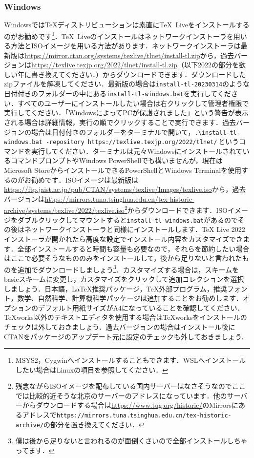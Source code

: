\subsubsection*{Windows}
Windowsでは\TeX ディストリビューションは素直に\TeX\ Liveをインストールするのがお勧めです\footnote{MSYS2，Cygwinへインストールすることもできます．WSLへインストールしたい場合はLinuxの項目を参照してください．}．\TeX\ Liveのインストールはネットワークインストーラを用いる方法とISOイメージを用いる方法があります．ネットワークインストーラは最新版は\url{https://mirror.ctan.org/systems/texlive/tlnet/install-tl.zip}から，過去バージョンは\url{https://texlive.texjp.org/2022/tlnet/install-tl.zip}（以下2022の部分を欲しい年に書き換えてください．）からダウンロードできます．ダウンロードしたzipファイルを解凍してください．最新版の場合は\texttt{install-tl-20230314}のような日付付きのフォルダーの中にある\texttt{install-tl-windows.bat}を実行してください．すべてのユーザーにインストールしたい場合は右クリックして管理者権限で実行してください．「WindowsによってPCが保護されました」という警告が表示される場合は詳細情報，実行の順でクリックすることで実行できます．過去バージョンの場合は日付付きのフォルダーをターミナルで開いて，\texttt{.\textbackslash install-tl-windows.bat -repository https://texlive.texjp.org/2022/tlnet/}\,というコマンドを実行してください．ターミナルは元々WindowsにインストールされているコマンドプロンプトやWindows PowerShellでも構いませんが，現在はMicrosoft StoreからインストールできるPowerShellとWindows Terminalを使用するのがお勧めです．ISOイメージは最新版は\url{https://ftp.jaist.ac.jp/pub/CTAN/systems/texlive/Images/texlive.iso}から，過去バージョンは\url{https://mirrors.tuna.tsinghua.edu.cn/tex-historic-archive/systems/texlive/2022/texlive.iso}\footnote{残念ながらISOイメージを配布している国内サーバーはなさそうなのでここでは比較的近そうな北京のサーバーのアドレスになっています．他のサーバーからダウンロードする場合は\url{https://www.tug.org/historic/}のMirrorsにあるアドレスで\texttt{https://mirrors.tuna.tsinghua.edu.cn/tex-historic-archive/}の部分を置き換えてください．}からダウンロードできます．ISOイメージをダブルクリックしてマウントすると\texttt{install-tl-windows.bat}があるのでその後はネットワークインストーラと同様にインストールします．TeX Live 2022インストーラが開かれたら高度な設定でインストール内容をカスタマイズできます．全部インストールすると時間も容量も必要なので，それらを節約したい場合はここで必要そうなもののみをインストールして，後から足りないと言われたものを追加でダウンロードしましょう\footnote{僕は後から足りないと言われるのが面倒くさいので全部インストールしちゃってます．}．カスタマイズする場合は，スキームをbasicスキームに変更し，カスタマイズをクリックして追加コレクションを選択しましょう．日本語，LaTeX推奨パッケージ，TeX外部プログラム，推奨フォント，数学、自然科学、計算機科学パッケージは追加することをお勧めします．オプションのデフォルト用紙サイズがA4になっていることを確認してください．TeXworks以外のテキストエディタを使用する場合はTeXworksをインストールのチェックは外しておきましょう．過去バージョンの場合はインストール後にCTANをパッケージのアップデート元に設定のチェックも外しておきましょう．